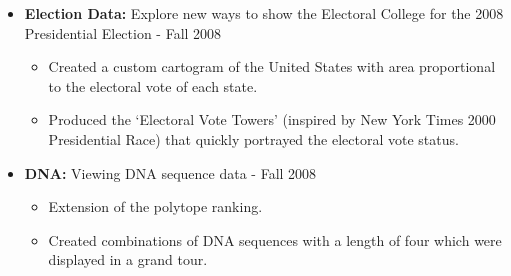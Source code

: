 \documentclass[oneside]{article}
\begin{document}
\begin{itemize}
  \item{\bf Election Data:} Explore new ways to show the Electoral College for the 2008 Presidential Election - Fall 2008
  \begin{itemize}
    \item Created a custom cartogram of the United States with area proportional to the electoral vote of each state.
    \item Produced the `Electoral Vote Towers' (inspired by New York Times 2000 Presidential Race) that quickly portrayed the electoral vote status.
  \end{itemize}





\item{\bf DNA:} Viewing DNA sequence data - Fall 2008
\begin{itemize}
  \item Extension of the polytope ranking.
  \item Created combinations of DNA sequences with a length of four which were displayed in a grand tour.
\end{itemize}


\end{itemize}
\end{document}
